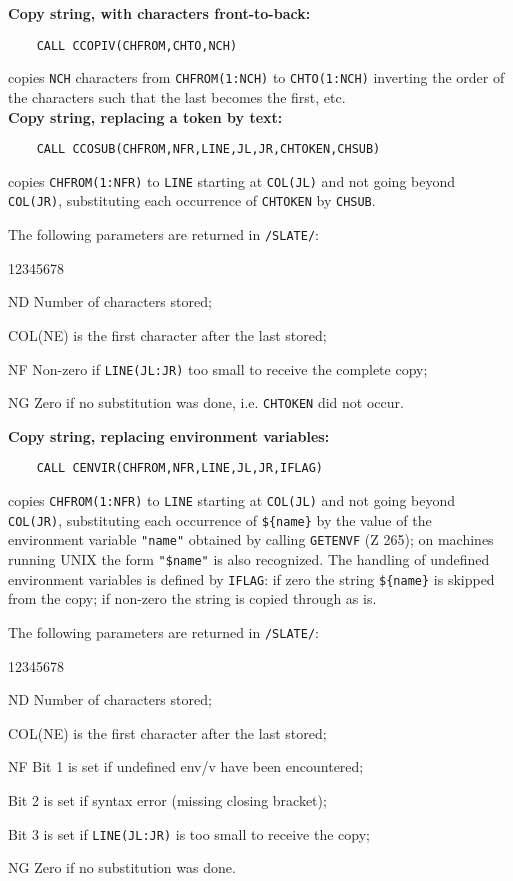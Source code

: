 {\bf Copy string, with characters front-to-back:}
\begin{verbatim}
    CALL CCOPIV(CHFROM,CHTO,NCH)
\end{verbatim}
copies {\tt NCH} characters from {\tt CHFROM(1:NCH)} to
{\tt CHTO(1:NCH)} inverting the order of the characters such that the
last becomes the first, etc. \\[2mm]
\newpage
{\bf Copy string, replacing a token by text:}
\begin{verbatim}
    CALL CCOSUB(CHFROM,NFR,LINE,JL,JR,CHTOKEN,CHSUB)
\end{verbatim}
copies {\tt CHFROM(1:NFR)} to {\tt LINE} starting at {\tt COL(JL)}
and not going beyond {\tt COL(JR)}, substituting each occurrence
of {\tt CHTOKEN} by {\tt CHSUB}.
\par
The following parameters are returned in {\tt /SLATE/}:
\begin{DLtt}{12345678}
\item[ND] Number of characters stored;
\item[COL(NE)] is the first character after the last stored;
\item[NF] Non-zero if {\tt LINE(JL:JR)} too small to receive
the complete copy;
\item[NG] Zero if no substitution was done, i.e.
{\tt CHTOKEN} did not occur.
\end{DLtt}
{\bf Copy string, replacing environment variables:}
\begin{verbatim}
    CALL CENVIR(CHFROM,NFR,LINE,JL,JR,IFLAG)
\end{verbatim}
copies {\tt CHFROM(1:NFR)} to {\tt LINE} starting at {\tt COL(JL)}
and not going beyond {\tt COL(JR)}, substituting each occurrence of
{\tt \$\{name\}} by the value of the
environment variable {\tt "name"}
obtained by calling {\tt GETENVF} (Z 265);
on machines running UNIX the form {\tt "\$name"} is also recognized.
The handling of undefined environment variables is defined by
{\tt IFLAG}: if zero the string {\tt \$\{name\}} is skipped from the
copy; if
non-zero the string is copied through as is.
\par
The following parameters are returned in {\tt /SLATE/}:
\begin{DLtt}{12345678}
\item[ND] Number of characters stored;
\item[COL(NE)] is the first character after the last stored;
\item[NF] Bit 1 is set if undefined env/v have been encountered;
\item[]   Bit 2 is set if syntax error (missing closing bracket);
\item[]   Bit 3 is set if {\tt LINE(JL:JR)} is too small to
receive the copy;
\item[NG] Zero if no substitution was done.
\end{DLtt}
